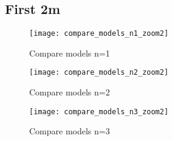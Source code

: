 \subsection{First 2m}
\begin{figure}[H]
  \centering
  \texttt{[image: compare\_models\_n1\_zoom2]}
  \caption{Compare models n=1}
  \label{fig:compare_models_n1}
\end{figure}
\begin{figure}[H]
  \centering
  \texttt{[image: compare\_models\_n2\_zoom2]}
  \caption{Compare models n=2}
  \label{fig:compare_models_n2}
\end{figure}
\begin{figure}[H]
  \centering
  \texttt{[image: compare\_models\_n3\_zoom2]}
  \caption{Compare models n=3}
  \label{fig:compare_models_n3}
\end{figure}

